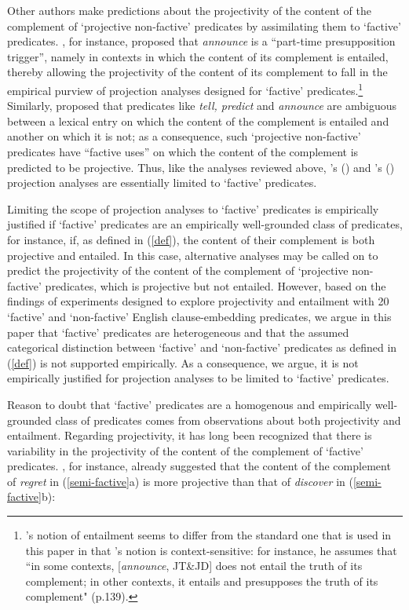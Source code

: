 \documentclass[11pt,fleqn]{article}
\newcommand{\6}{\mbox{$[\hspace*{-.6mm}[$}}
\newcommand{\9}{\mbox{$]\hspace*{-.6mm}]$}}
\newcommand{\citepos}[1]{\citeauthor{#1}'s \citeyear{#1}}
\newcommand{\citetpos}[1]{\citeauthor{#1}'s (\citeyear{#1})}
\begin{document}
Other authors make predictions about the projectivity of the content of the complement of `projective non-factive' predicates by assimilating them to `factive' predicates. \citet[139]{schlenker10}, for instance, proposed that {\em announce} is a ``part-time presupposition trigger'', namely in contexts in which the content of its complement is entailed, thereby allowing the projectivity of the content of its complement to fall in the empirical purview of projection analyses designed for `factive' predicates.\footnote{\citepos{schlenker10} notion of entailment seems to differ from the standard one that is used in this paper in that \citepos{schlenker10} notion is context-sensitive: for instance, he assumes that ``in some contexts, [{\em announce}, JT\&JD] does not entail the truth of its complement; in other contexts, it entails and presupposes the truth of its complement" (p.139).}  Similarly, \citet[1736]{spector-egre2015} proposed that predicates like {\em tell, predict} and {\em announce}  are ambiguous between a lexical entry on which the content of the complement is entailed and another on which it is not; as a consequence, such `projective non-factive' predicates have ``factive uses'' on which the content of the complement is predicted to be projective. Thus, like the analyses reviewed above, \citetpos{schlenker10} and \citetpos{spector-egre2015} projection analyses are essentially limited to `factive' predicates.

Limiting the scope of projection analyses to `factive' predicates is empirically justified if `factive' predicates are an empirically well-grounded class of predicates, for instance, if, as defined in (\ref{def}), the content of their complement is both projective and entailed. In this case, alternative analyses may be called on to predict the projectivity of the content of the complement of `projective non-factive' predicates, which is projective but not entailed. However, based on the findings of experiments designed to explore projectivity and entailment with 20 `factive' and `non-factive' English clause-embedding predicates, we argue in this paper that `factive' predicates are heterogeneous and that the assumed categorical distinction between `factive' and `non-factive' predicates as defined in (\ref{def}) is not supported empirically. As a consequence, we argue, it is not empirically justified for projection analyses to be limited to `factive' predicates.

Reason to doubt that `factive' predicates are a homogenous and empirically well-grounded class of predicates comes  from observations about both projectivity and entailment. Regarding projectivity, it has long been recognized that there is variability in the projectivity of the content of the complement of `factive' predicates. \citet{karttunen71b}, for instance, already suggested that the content of the complement of {\em regret} in (\ref{semi-factive}a) is more projective than that of {\em discover} in (\ref{semi-factive}b): 
\end{document}
